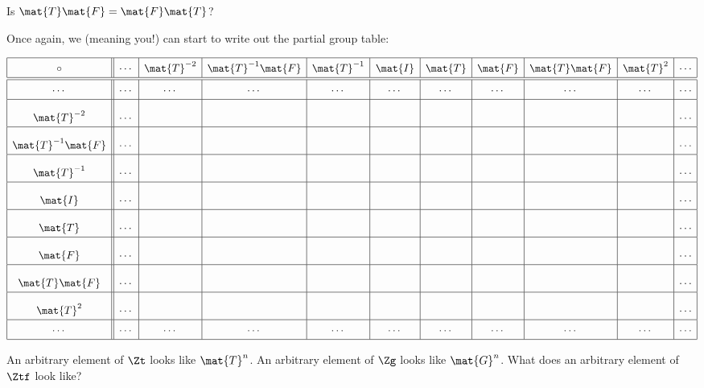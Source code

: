 \begin{ques} Is $\mat{T}\mat{F} = \mat{F}\mat{T}$?
\end{ques}
\QM

Once again, we (meaning you!) can start to write out the partial group
table:


\[
{
\renewcommand{\arraystretch}{1.5}
\begin{array}{| c || c | c | c | c | c | c | c | c | c | c|}
\hline
\circ & \cdots & \mat{T}^{-2} & \mat{T}^{-1}\mat{F}  & \mat{T}^{-1} & \mat{I} & \mat{T} &  \mat{F} & \mat{T} \mat{F} & \mat{T}^2  & \cdots \\ \hline \hline
\cdots &\cdots & \cdots & \cdots  & \cdots & \cdots &  \cdots  & \cdots & \cdots &  \cdots &  \cdots\\ \hline
\mat{T}^{-2} & \cdots &\rule[7mm]{13mm}{0mm} &\rule[7mm]{13mm}{0mm} &\rule[7mm]{13mm}{0mm} &\rule[7mm]{13mm}{0mm}  &\rule[7mm]{13mm}{0mm} &\rule[7mm]{13mm}{0mm} &\rule[7mm]{13mm}{0mm} &  \rule[7mm]{13mm}{0mm} &  \cdots\\ \hline
\mat{T}^{-1} \mat{F} & \cdots &\rule[7mm]{13mm}{0mm} & & & & & & & & \cdots \\ \hline
\mat{T}^{-1} & \cdots &\rule[7mm]{13mm}{0mm} & & & & & & & & \cdots \\ \hline
\mat{I} & \cdots &\rule[7mm]{13mm}{0mm} & & & & & & & &\cdots \\ \hline
\mat{T} & \cdots &\rule[7mm]{13mm}{0mm} & & & & & & & & \cdots \\ \hline
\mat{F} & \cdots &\rule[7mm]{13mm}{0mm} & & & & & & & & \cdots \\ \hline
\mat{T} \mat{F} & \cdots &\rule[7mm]{13mm}{0mm} & & & & & & & & \cdots \\ \hline
\mat{T}^2 & \cdots &\rule[7mm]{13mm}{0mm} & & & & & & & &\cdots \\ \hline
\cdots & \cdots & \cdots  &\cdots &\cdots &\cdots &\cdots & \cdots &\cdots &\cdots & \cdots \\ \hline
\end{array}}
\]

\begin{ques}
An arbitrary element of $\Zt$ looks like $\mat{T}^n$. An arbitrary
element of $\Zg$ looks like $\mat{G}^n$. What does an arbitrary element
of $\Ztf$ look like?
\end{ques}
\QM










